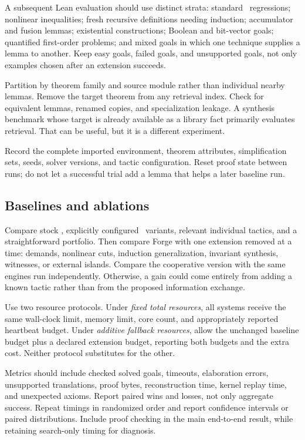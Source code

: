 A subsequent Lean evaluation should use distinct strata: standard \grind\
regressions; nonlinear inequalities; fresh recursive definitions needing
induction; accumulator and fusion lemmas; existential constructions; Boolean
and bit-vector goals; quantified first-order problems; and mixed goals in
which one technique supplies a lemma to another. Keep easy goals, failed goals,
and unsupported goals, not only examples chosen after an extension succeeds.

Partition by theorem family and source module rather than individual nearby
lemmas. Remove the target theorem from any retrieval index. Check for equivalent
lemmas, renamed copies, and specialization leakage. A synthesis benchmark
whose target is already available as a library fact primarily evaluates
retrieval. That can be useful, but it is a different experiment.

Record the complete imported environment, theorem attributes, simplification
sets, seeds, solver versions, and tactic configuration. Reset proof state
between runs; do not let a successful trial add a lemma that helps a later
baseline run.

\subsection{Baselines and ablations}

Compare stock \grind, explicitly configured \grind\ variants, relevant
individual tactics, and a straightforward portfolio. Then compare Forge with
one extension removed at a time: demands, nonlinear cuts, induction
generalization, invariant synthesis, witnesses, or external islands. Compare
the cooperative version with the same engines run independently. Otherwise,
a gain could come entirely from adding a known tactic rather than from the
proposed information exchange.

Use two resource protocols. Under \emph{fixed total resources}, all systems
receive the same wall-clock limit, memory limit, core count, and appropriately
reported heartbeat budget. Under \emph{additive fallback resources}, allow the
unchanged baseline budget plus a declared extension budget, reporting both
budgets and the extra cost. Neither protocol substitutes for the other.

Metrics should include checked solved goals, timeouts, elaboration errors,
unsupported translations, proof bytes, reconstruction time, kernel replay time,
and unexpected axioms. Report paired wins and losses, not only aggregate
success. Repeat timings in randomized order and report confidence intervals
or paired distributions. Include proof checking in the main end-to-end result,
while retaining search-only timing for diagnosis.

